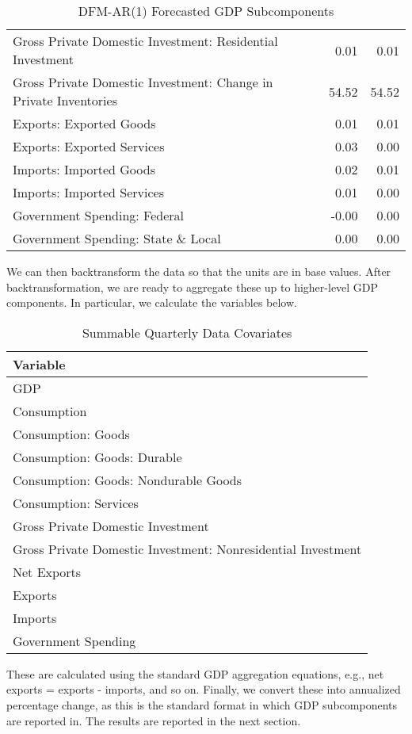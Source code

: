 \documentclass[11pt, letterpaper]{article}\usepackage[]{graphicx}\usepackage[]{color}
\begin{document}
\begin{table}[H]
\begin{tabular}{lrrr}
  Gross Private Domestic Investment: Residential Investment &  & 0.01 & 0.01 \\ 
  Gross Private Domestic Investment: Change in Private Inventories &  & 54.52 & 54.52 \\ 
  Exports: Exported Goods &  & 0.01 & 0.01 \\ 
  Exports: Exported Services &  & 0.03 & 0.00 \\ 
  Imports: Imported Goods &  & 0.02 & 0.01 \\ 
  Imports: Imported Services &  & 0.01 & 0.00 \\ 
  Government Spending: Federal &  & -0.00 & 0.00 \\ 
  Government Spending: State \& Local &  & 0.00 & 0.00 \\ 
   \hline
\end{tabular}
\endgroup
\caption{DFM-AR(1) Forecasted GDP Subcomponents} 
\end{table}


We can then backtransform the data so that the units are in base values. After backtransformation, we are ready to aggregate these up to higher-level GDP components. In particular, we calculate the variables below.
\begin{table}[H]
\centering
\begingroup\scriptsize
\begin{tabular}{l}
  \hline
Variable \\ 
  \hline
GDP \\ 
  Consumption \\ 
  Consumption: Goods \\ 
  Consumption: Goods: Durable \\ 
  Consumption: Goods: Nondurable Goods \\ 
  Consumption: Services \\ 
  Gross Private Domestic Investment \\ 
  Gross Private Domestic Investment: Nonresidential Investment \\ 
  Net Exports \\ 
  Exports \\ 
  Imports \\ 
  Government Spending \\ 
   \hline
\end{tabular}
\endgroup
\caption{Summable Quarterly Data Covariates} 
\end{table}

These are calculated using the standard GDP aggregation equations, e.g., net exports = exports - imports, and so on.
Finally, we convert these into annualized percentage change, as this is the standard format in which GDP subcomponents are reported in. The results are reported in the next section.
\end{document}
